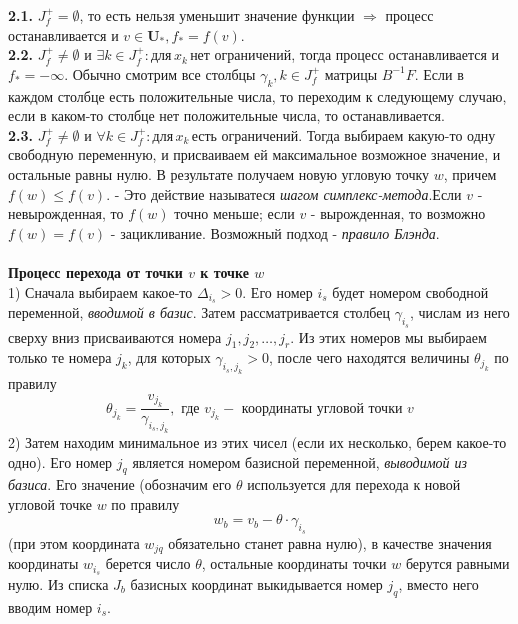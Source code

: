 \documentclass[A4]{article}
\begin{document}
\quad\textbf{2.1.} $J_f^+=\emptyset$, то есть нельзя уменьшит значение функции $\Rightarrow$ процесс останавливается и $v\in\mathbf{U}_*,f_*=f(v)$.\\
\quad\textbf{2.2.} $J_f^+\ne\emptyset$ и $\exists k\in J_f^+: \text{для}\, x_k\,\text{нет ограничений}$, тогда процесс останавливается и $f_*=-\infty$. Обычно смотрим все столбцы $\gamma_k,k\in J_f^+$ матрицы $B^{-1}F$. Если в каждом столбце есть положительные числа, то переходим к следующему случаю, если в каком-то столбце нет положительные числа, то останавливается.\\
\quad\textbf{2.3.} $J_f^+\ne\emptyset$ и $\forall k\in J_f^+: \text{для}\, x_k\,\text{есть ограничений}$. Тогда выбираем какую-то одну свободную переменную, и присваиваем ей максимальное возможное значение, и остальные равны нулю. В результате получаем новую угловую точку $w$, причем $f(w)\leqslant f(v)$.  - Это действие называтеся \emph{шагом симплекс-метода}.Если $v$ - невырожденная, то $f(w)$ точно меньше; если $v$ - вырожденная, то возможно $f(w)=f(v)$ - зацикливание. Возможный подход - \emph{правило Блэнда}.\\
\\
\textbf{Процесс перехода от точки $ v$ к точке $ w $}\\
1) Сначала выбираем какое-то $ \Delta_{i_{s}}>0$. Его номер $ i_{s} $ будет номером свободной переменной, \emph{вводимой в базис}. Затем рассматривается столбец $ \gamma_{i_{s}}$, числам из него сверху вниз присваиваются номера $ j_{1}, j_{2}, \ldots, j_{r} $. Из этих номеров мы выбираем только те номера $ j_{k}$,  для которых $ \gamma_{i_{s}, j_{k}}>0$,  после чего находятся величины $ \theta_{j_k}$ по правилу
\begin{equation*}
\theta_{j_{k}}=\frac{v_{j_{k}}}{\gamma_{i_{s}, j_{k}}}, \text { где } v_{j_{k}} -\text { координаты угловой точки } v
\end{equation*}
2) Затем находим минимальное из этих чисел (если их несколько, берем какое-то одно). Его номер $ j_{q} $ является номером базисной переменной, \emph{выводимой из базиса}. Его значение (обозначим его $\theta$ используется для перехода к новой угловой точке $ w $ по правилу
\begin{equation*}
w_{b}=v_{b}-\theta \cdot \gamma_{i_{s}}
\end{equation*}
(при этом координата $ w_{j q} $ обязательно станет равна нулю), в качестве значения координаты $ w_{i_{s}} $ берется число $ \theta$, остальные координаты точки $ w $ берутся равными нулю. Из списка $ J_{b} $ базисных координат выкидывается номер $ j_{q}$, вместо него вводим номер $ i_{s} $.   
\end{document}
